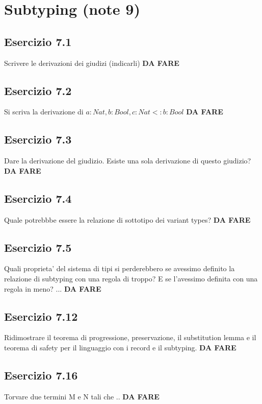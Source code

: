 \section{Subtyping (note 9)}
\subsection*{Esercizio 7.1}
Scrivere le derivazioni dei giudizi (indicarli) 
\textbf{{\color{red} DA FARE}}

\subsection*{Esercizio 7.2}
Si scriva la derivazione di ${a:Nat, b:Bool, c:Nat} <: {b:Bool}$ 
\textbf{{\color{red} DA FARE}}

\subsection*{Esercizio 7.3}

Dare la derivazione del giudizio. Esiste
una sola derivazione di questo giudizio? 
\textbf{{\color{red} DA FARE}}

\subsection*{Esercizio 7.4}
Quale potrebbbe essere la relazione di sottotipo dei variant types? 
\textbf{{\color{red} DA FARE}}

\subsection*{Esercizio 7.5}
Quali proprieta' del sistema di tipi si perderebbero se avessimo definito la relazione di
subtyping con una regola di troppo? E se l'avessimo definita con una regola in meno? ... 
\textbf{{\color{red} DA FARE}}

\subsection*{Esercizio 7.12}
Ridimostrare il teorema di progressione, preservazione, il substitution lemma e il teorema
di safety per il linguaggio con i record e il subtyping. 
\textbf{{\color{red} DA FARE}}

\subsection*{Esercizio 7.16}
Torvare due termini M e N tali che ..
\textbf{{\color{red} DA FARE}}